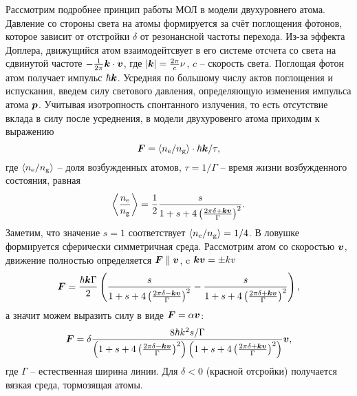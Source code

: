 % 


\startp
{}
Рассмотрим подробнее принцип работы МОЛ в модели двухуровнего атома. Давление со стороны света на атомы формируется за счёт поглощения фотонов, которое зависит от отстройки $\delta$ от резонансной частоты перехода. Из-за эффекта Доплера, движущийся атом взаимодейтсвует в его системе отсчета со света на сдвинутой частоте $- \frac{1}{2\pi} \boldsymbol{k} \cdot \boldsymbol{v}$, где $|\boldsymbol{k}| = \frac{2\pi}{c}\nu$, $c$ -- скорость света. Поглощая фотон атом получает импульс $\hbar \boldsymbol{k}$. Усредняя по большому числу актов поглощения и испускания, введем силу светового давления, определяющую изменения импульса атома $\boldsymbol{p}$. Учитывая изотропность спонтанного излучения, то есть отсутствие вклада в силу после усреднения, в модели двухуровенго атома приходим к выражению
\begin{equation}
	\boldsymbol{F} = \langle n_{\textnormal{e}} / n_{\textnormal{g}} \rangle \cdot \hbar \boldsymbol{k} / \tau,
\end{equation}
где $\langle n_{\textnormal{e}} / n_{\textnormal{g}} \rangle$ -- доля возбужденных атомов, $\tau = 1/\Gamma$ -- время жизни возбужденного состояния, равная
\begin{equation}
	\left\langle 
		\frac{n_{\textnormal{e}}}{n_{\textnormal{g}}}
	\right\rangle = \frac{1}{2} \frac{s}{1+s+4\left(\frac{2 \pi \delta + \boldsymbol{k} \boldsymbol{v}}{\Gamma}\right)^2}.
\end{equation}
Заметим, что значение $s=1$ соответствует $\langle n_{\textnormal{e}} / n_{\textnormal{g}} \rangle=1/4$. В ловушке формируется сферически симметричная среда. Рассмотрим атом со скоростью $\boldsymbol{v}$, движение полностью определяется $\boldsymbol{F} \parallel \boldsymbol{v}$, c $\boldsymbol{k} \boldsymbol{v} = \pm k v$
\begin{equation}
	\boldsymbol{F} = \frac{\hbar \boldsymbol{k} \Gamma}{2}\left(
		\frac{s}{1+s+4\left(\frac{2\pi \delta - \boldsymbol{k} \boldsymbol{v}}{\Gamma}\right)^2}-
		\frac{s}{1+s+4\left(\frac{2\pi \delta + \boldsymbol{k} \boldsymbol{v}}{\Gamma}\right)^2}
	\right),
	\label{eq:FM1}
\end{equation}
а значит можем выразить силу в виде $\boldsymbol{F} = \alpha \boldsymbol{v}$:
\begin{equation}
	\boldsymbol{F} = \delta \frac{8 \hbar k^2  s / \Gamma}{
		\left(
			1+s+4\left(\frac{2\pi \delta - \boldsymbol{k} \boldsymbol{v}}{\Gamma}\right)^2
		\right)\left(
			1+s+4\left(\frac{2\pi\delta+\boldsymbol{k} \boldsymbol{v}}{\Gamma}\right)^2
		\right)
	}\boldsymbol{v},
	\label{eq:FM2}
\end{equation}
где $\Gamma$ -- естественная ширина линии. Для $\delta < 0$ (красной отсройки) получается вязкая среда, тормозящая атомы. 



